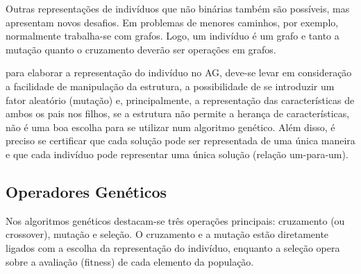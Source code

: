 Outras representações de indivíduos que não binárias também são possíveis, mas apresentam novos desafios. Em problemas de menores caminhos, por exemplo, normalmente trabalha-se com grafos. Logo, um indivíduo é um grafo e tanto a mutação quanto o cruzamento deverão ser operações em grafos.

para elaborar a representação do indivíduo no AG, deve-se levar em consideração a facilidade de manipulação da estrutura, a possibilidade de se introduzir um fator aleatório (mutação) e, principalmente, a representação das características de ambos os pais nos filhos, se a estrutura não permite a herança de características, não é uma boa escolha para se utilizar num algoritmo genético. Além disso, é preciso se certificar que cada solução pode ser representada de uma única maneira e que cada indivíduo pode representar uma única solução (relação um-para-um).

\subsection{Operadores Genéticos}
Nos algoritmos genéticos destacam-se três operações principais: cruzamento (ou crossover), mutação e seleção. O cruzamento e a mutação estão diretamente ligados com a escolha da representação do indivíduo, enquanto a seleção opera sobre a avaliação (fitness) de cada elemento da população.

